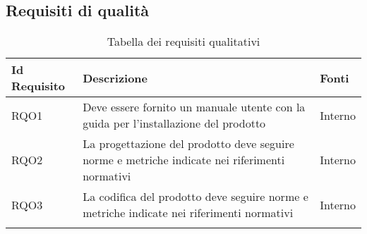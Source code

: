 \subsection{Requisiti di qualità} \label{requisiti qualita}
\begin{center}
    \begin{longtable}{ | >{\centering\arraybackslash}m{2.5cm} | >{\centering\arraybackslash}m{8cm} | >{\centering\arraybackslash}m{2.5cm} | }
        
        \hline
        \textbf{Id Requisito} & \textbf{Descrizione} & \textbf{Fonti} \\ \hline
        \endhead
    	RQO1 & Deve essere fornito un manuale utente con la guida per l'installazione del prodotto & Interno\\ \hline
    	RQO2 & La progettazione del prodotto deve seguire norme e metriche indicate nei riferimenti normativi & Interno \\ \hline
    	RQO3 & La codifica del prodotto deve seguire norme e metriche indicate nei riferimenti normativi & Interno \\ \hline
    	\caption[Requisiti qualitativi]{Tabella dei requisiti qualitativi}
    \end{longtable}
    
\end{center}
